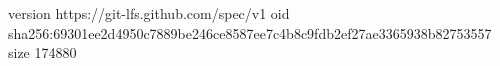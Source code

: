 version https://git-lfs.github.com/spec/v1
oid sha256:69301ee2d4950c7889be246ce8587ee7c4b8c9fdb2ef27ae3365938b82753557
size 174880
